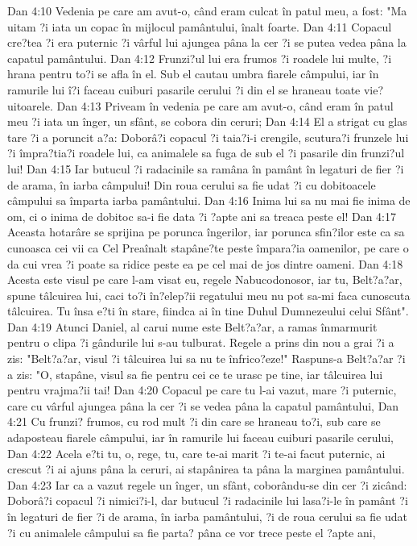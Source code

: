 Dan 4:10  Vedenia pe care am avut-o, când eram culcat în patul meu, a fost: "Ma uitam ?i iata un copac în mijlocul pamântului, înalt foarte.
Dan 4:11  Copacul cre?tea ?i era puternic ?i vârful lui ajungea pâna la cer ?i se putea vedea pâna la capatul pamântului.
Dan 4:12  Frunzi?ul lui era frumos ?i roadele lui multe, ?i hrana pentru to?i se afla în el. Sub el cautau umbra fiarele câmpului, iar în ramurile lui î?i faceau cuiburi pasarile cerului ?i din el se hraneau toate vie?uitoarele.
Dan 4:13  Priveam în vedenia pe care am avut-o, când eram în patul meu ?i iata un înger, un sfânt, se cobora din ceruri;
Dan 4:14  El a strigat cu glas tare ?i a poruncit a?a: Doborâ?i copacul ?i taia?i-i crengile, scutura?i frunzele lui ?i împra?tia?i roadele lui, ca animalele sa fuga de sub el ?i pasarile din frunzi?ul lui!
Dan 4:15  Iar butucul ?i radacinile sa ramâna în pamânt în legaturi de fier ?i de arama, în iarba câmpului! Din roua cerului sa fie udat ?i cu dobitoacele câmpului sa împarta iarba pamântului.
Dan 4:16  Inima lui sa nu mai fie inima de om, ci o inima de dobitoc sa-i fie data ?i ?apte ani sa treaca peste el!
Dan 4:17  Aceasta hotarâre se sprijina pe porunca îngerilor, iar porunca sfin?ilor este ca sa cunoasca cei vii ca Cel Preaînalt stapâne?te peste împara?ia oamenilor, pe care o da cui vrea ?i poate sa ridice peste ea pe cel mai de jos dintre oameni.
Dan 4:18  Acesta este visul pe care l-am visat eu, regele Nabucodonosor, iar tu, Belt?a?ar, spune tâlcuirea lui, caci to?i în?elep?ii regatului meu nu pot sa-mi faca cunoscuta tâlcuirea. Tu însa e?ti în stare, fiindca ai în tine Duhul Dumnezeului celui Sfânt".
Dan 4:19  Atunci Daniel, al carui nume este Belt?a?ar, a ramas înmarmurit pentru o clipa ?i gândurile lui s-au tulburat. Regele a prins din nou a grai ?i a zis: "Belt?a?ar, visul ?i tâlcuirea lui sa nu te înfrico?eze!" Raspuns-a Belt?a?ar ?i a zis: "O, stapâne, visul sa fie pentru cei ce te urasc pe tine, iar tâlcuirea lui pentru vrajma?ii tai!
Dan 4:20  Copacul pe care tu l-ai vazut, mare ?i puternic, care cu vârful ajungea pâna la cer ?i se vedea pâna la capatul pamântului,
Dan 4:21  Cu frunzi? frumos, cu rod mult ?i din care se hraneau to?i, sub care se adaposteau fiarele câmpului, iar în ramurile lui faceau cuiburi pasarile cerului,
Dan 4:22  Acela e?ti tu, o, rege, tu, care te-ai marit ?i te-ai facut puternic, ai crescut ?i ai ajuns pâna la ceruri, ai stapânirea ta pâna la marginea pamântului.
Dan 4:23  Iar ca a vazut regele un înger, un sfânt, coborându-se din cer ?i zicând: Doborâ?i copacul ?i nimici?i-l, dar butucul ?i radacinile lui lasa?i-le în pamânt ?i în legaturi de fier ?i de arama, în iarba pamântului, ?i de roua cerului sa fie udat ?i cu animalele câmpului sa fie parta? pâna ce vor trece peste el ?apte ani,
